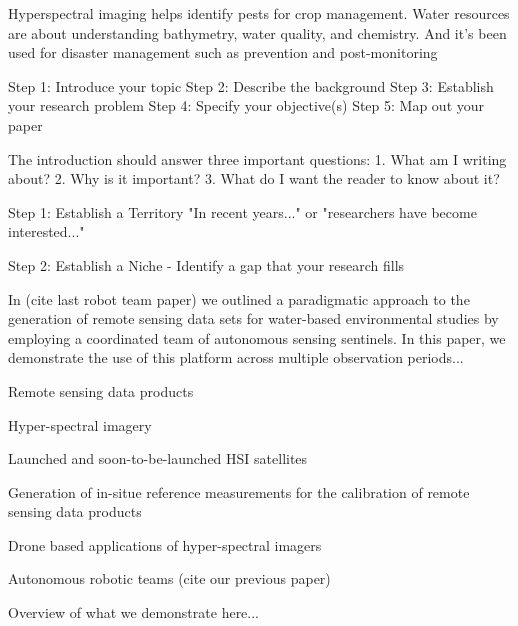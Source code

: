 \documentclass[journal,article,submit,pdftex,moreauthors]{Definitions/mdpi}
\begin{document}
Hyperspectral imaging helps identify pests for crop management. Water resources are about understanding bathymetry, water quality, and chemistry. And it’s been used for disaster management such as prevention and post-monitoring


Step 1: Introduce your topic
Step 2: Describe the background
Step 3: Establish your research problem
Step 4: Specify your objective(s)
Step 5: Map out your paper


The introduction should answer three important questions:
1. What am I writing about?
2. Why is it important?
3. What do I want the reader to know about it?

Step 1: Establish a Territory
"In recent years..." or "researchers have become interested..." 

Step 2: Establish a Niche
- Identify a gap that your research fills 



In (cite last robot team paper) we outlined a paradigmatic approach to the generation of remote sensing data sets for water-based environmental studies by employing a coordinated team of autonomous sensing sentinels. In this paper, we demonstrate the use of this platform across multiple observation periods...



Remote sensing data products 

Hyper-spectral imagery

Launched and soon-to-be-launched HSI satellites 

Generation of in-situe reference measurements for the calibration of remote sensing data products 

Drone based applications of hyper-spectral imagers

Autonomous robotic teams (cite our previous paper) 

Overview of what we demonstrate here...

\\
\end{document}
